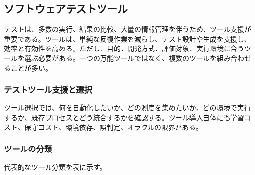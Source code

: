 \subsection{ソフトウェアテストツール}
テストは、多数の実行、結果の比較、大量の情報管理を伴うため、ツール支援が重要である。ツールは、単純な反復作業を減らし、テスト設計や生成を支援し、効率と有効性を高める。ただし、目的、開発方式、評価対象、実行環境に合うツールを選ぶ必要がある。一つの万能ツールではなく、複数のツールを組み合わせることが多い。

\subsubsection{テストツール支援と選択}
ツール選択では、何を自動化したいか、どの測度を集めたいか、どの環境で実行するか、既存プロセスとどう統合するかを確認する。ツール導入自体にも学習コスト、保守コスト、環境依存、誤判定、オラクルの限界がある。

\subsubsection{ツールの分類}
代表的なツール分類を表に示す。


